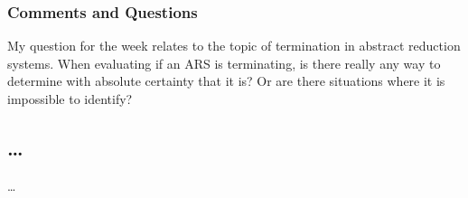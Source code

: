 \documentclass{article}
\theoremstyle{theorem}
\theoremstyle{definition}
\theoremstyle{remark}
\begin{document}
\subsubsection*{Comments and Questions}
My question for the week relates to the topic of termination in abstract reduction systems. When evaluating if an ARS
is terminating, is there really any way to determine with absolute certainty that it is? Or are there situations where
it is impossible to identify?
\subsection{\ldots}

\ldots








\end{document}
